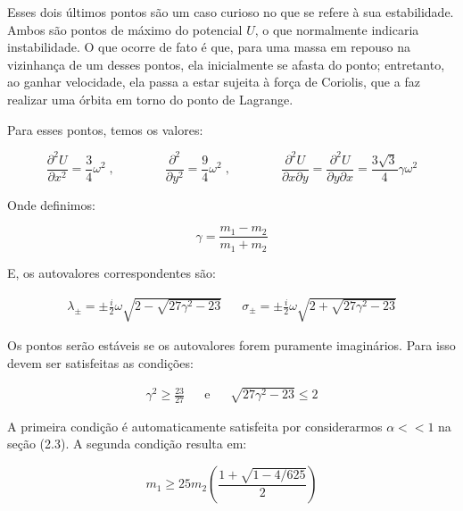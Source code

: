 Esses dois últimos pontos são um caso curioso no que se refere à sua estabilidade. Ambos são pontos de máximo do potencial $U$, o que normalmente indicaria instabilidade. O que ocorre de fato é que, para uma massa em repouso na vizinhança de um desses pontos, ela inicialmente se afasta do ponto; entretanto, ao ganhar velocidade, ela passa a estar sujeita à força de Coriolis, que a faz realizar uma órbita em torno do ponto de Lagrange.

Para esses pontos, temos os valores:

\begin{equation}
\dfrac{\partial ^2U}{\partial x^2} = \dfrac{3}{4}\omega^2 \;, \qquad \qquad \dfrac{\partial ^2}{\partial y^2} = \dfrac{9}{4}\omega^2 \;, \qquad \qquad \dfrac{\partial ^2U}{\partial x\partial y} = \dfrac{\partial ^2U}{\partial y\partial x} = \dfrac{3\sqrt{3}}{4}\gamma \omega^2
\end{equation}

\vspace{20px}

Onde definimos: 

\vspace{-35px}

\begin{equation*}
\!\!\!\!\!\!\!\!\!\!\!\!\!\!\!\!\!\!\!\!\!\!\!\!\!\!\!\!\!\!\!\!\!\!\!\!\!\!\!\!\!\!\!\!\!\!\!\!\!\!\!\!\!\!\!\!\!\!\!\!\!\!\!\!\!\!\!\!\!\!\!\!\!\!\!\!\!\!\!\!\!\!\!\!\!\!\!\!\!\!\!\!\!\!\!\!\!\!\!\!\!\!\!\!\!\!\!\!\!\!\!\!\!\!\!\!\!\!\!\!\!\!\!\!\!\! \gamma = \dfrac{m_1-m_2}{m_1+m_2}
\end{equation*}

E, os autovalores correspondentes são:

\begin{align}
\lambda_{\pm} = \pm \frac{i}{2} \omega \sqrt{2-\sqrt{27\gamma^2-23}} && \sigma_{\pm} = \pm \frac{i}{2} \omega \sqrt{2 +\sqrt{27\gamma^2 - 23}}
\end{align}

Os pontos serão estáveis se os autovalores forem puramente imaginários. Para isso devem ser satisfeitas as condições:

\begin{align}
\gamma^2 \geq \frac{23}{27} && \text{e} && \sqrt{27\gamma^2 -23} \leq 2
\end{align}

A primeira condição é automaticamente satisfeita por considerarmos $\alpha << 1$ na seção (2.3). A segunda condição resulta em:

\begin{equation}
m_1 \geq 25m_2\left(\dfrac{1+\sqrt{1-4/625}}{2}\right)
\end{equation}


